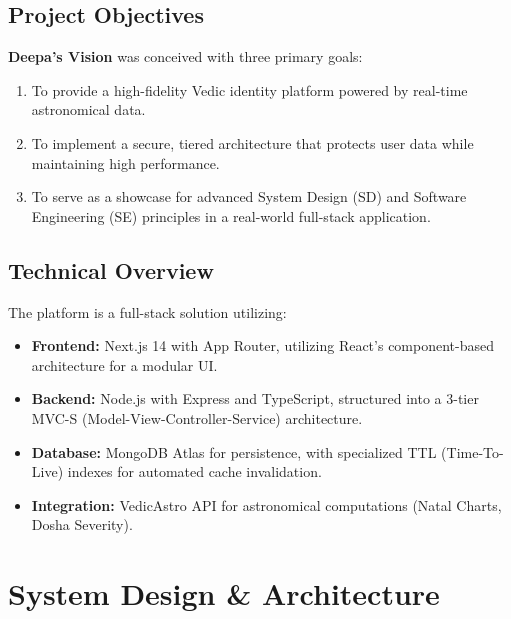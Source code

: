 \documentclass[12pt,a4paper]{article}
\begin{document}
\subsection{Project Objectives}
\textbf{Deepa's Vision} was conceived with three primary goals:
\begin{enumerate}
    \item To provide a high-fidelity Vedic identity platform powered by real-time astronomical data.
    \item To implement a secure, tiered architecture that protects user data while maintaining high performance.
    \item To serve as a showcase for advanced System Design (SD) and Software Engineering (SE) principles in a real-world full-stack application.
\end{enumerate}

\subsection{Technical Overview}
The platform is a full-stack solution utilizing:
\begin{itemize}
    \item \textbf{Frontend:} Next.js 14 with App Router, utilizing React's component-based architecture for a modular UI.
    \item \textbf{Backend:} Node.js with Express and TypeScript, structured into a 3-tier MVC-S (Model-View-Controller-Service) architecture.
    \item \textbf{Database:} MongoDB Atlas for persistence, with specialized TTL (Time-To-Live) indexes for automated cache invalidation.
    \item \textbf{Integration:} VedicAstro API for astronomical computations (Natal Charts, Dosha Severity).
\end{itemize}

\section{System Design \& Architecture}
\end{document}
